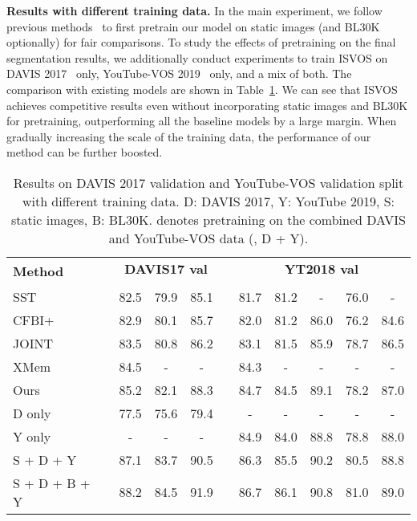 \documentclass[10pt,twocolumn,letterpaper]{article}
\newcommand{\system}{ISVOS\xspace}
\begin{document}
\vspace{0.05in}
\noindent \textbf{Results with different training data.} In the main experiment, we follow previous methods~\cite{oh2019video,cheng2021mivos,cheng2021stcn,cheng2022xmem} to first pretrain our model on static images (and BL30K optionally) for fair comparisons. To study the effects of pretraining on the final segmentation results, we additionally conduct experiments to train \system on DAVIS 2017~\cite{pont20172017} only, YouTube-VOS 2019~\cite{xu2018YouTube} only, and a mix of both. The comparison with existing models are shown in Table~\ref{tab:data}. We can see that \system achieves competitive results even without incorporating static images and BL30K for pretraining, outperforming all the baseline models by a large margin. When gradually increasing the scale of the training data, the performance of our method can be further boosted.

\begin{table}[!ht]
\centering
  \renewcommand\arraystretch{1.1}
  \setlength{\tabcolsep}{0pt}
  \begin{tabular*}{\linewidth}{@{\extracolsep{\fill}}lc | cccc | ccccc @{}}
    \toprule
    \multirow{2}{0.7in}{\textbf{Method}} && \multicolumn{3}{c}{\textbf{DAVIS17 val}} && \multicolumn{5}{c}{\textbf{YT2018 val}}  \\
    ~ &&  &  &  &&   &  &  &  &  \\
    \midrule
    SST~\cite{duke2021sstvos} && 82.5 & 79.9 & 85.1 && 81.7 & 81.2 & - & 76.0 & - \\
    CFBI+~\cite{yang2021collaborative} && 82.9 & 80.1 & 85.7 && 82.0 & 81.2 & 86.0 & 76.2 & 84.6 \\
    JOINT~\cite{mao2021joint} && 83.5 & 80.8 & 86.2 && 83.1 & 81.5 & 85.9 & 78.7 & 86.5 \\
    XMem && 84.5 & - & - && 84.3 & - & - & - & -\\
    Ours && 85.2 & 82.1 & 88.3 && 84.7 & 84.5 & 89.1 & 78.2 & 87.0 \\
    \cmidrule{1-1} \cmidrule{3-11}
    D only && 77.5 & 75.6 & 79.4 && - & - & - & - & - \\
    Y only && - & - & - && 84.9 & 84.0 & 88.8 & 78.8 &  88.0 \\
    S + D + Y && 87.1 & 83.7 & 90.5 && 86.3 & 85.5 & 90.2 & 80.5 & 88.8 \\
    S + D + B + Y && 88.2 & 84.5 & 91.9 && 86.7 & 86.1 & 90.8 & 81.0 & 89.0 \\
    \bottomrule
  \end{tabular*}
  \vspace{-0.1in}
 \caption{Results on DAVIS 2017 validation and YouTube-VOS validation split with different training data. D: DAVIS 2017, Y: YouTube 2019, S: static images, B: BL30K.   denotes pretraining on the combined DAVIS and YouTube-VOS data (\ie, D + Y). }
\label{tab:data}
\vspace{0.1in}
\end{table}
\end{document}

